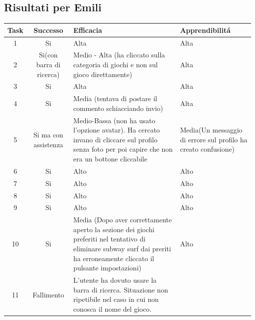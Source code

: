 \documentclass[../Report.tex]{subfiles}
\begin{document}
    \subsection{Risultati per Emili}
    \begin{table}[H]
        \begin{tabular}{|c|c|p{5cm}|p{4cm}|}
            \hline
            Task & Successo & Efficacia & Apprendibilitá \\
            \hline
            1 & Si & Alta & Alta \\
            \hline
            2 & Si(con barra di ricerca) & Medio - Alta (ha cliccato sulla categoria di giochi e non sul gioco direttamente) & Alta \\
            \hline
            3 & Si & Alta & Alta \\
            \hline
            4 & Si & Media (tentava di postare il commento schiacciando invio) & Alta \\
            \hline
            5 & Si ma con assistenza & Medio-Bassa
            (non ha usato l’opzione avatar). Ha cercato invano di cliccare sul profilo senza foto per poi capire che non era un bottone cliccabile & Media(Un messaggio di errore sul profilo ha creato confusione)   \\
            \hline
            6 & Si & Alto & Alto \\
            \hline
            7 & Si & Alto & Alto \\
            \hline
            8 & Si & Alto & Alto \\
            \hline
            9 & Si & Alto & Alto \\
            \hline
            10 & Si & Media (Dopo aver correttamente aperto la sezione dei giochi preferiti nel tentativo di eliminare subway surf dai preriti ha erroneamente cliccato il pulsante impostazioni) & Alto \\
            \hline 
            11 & Fallimento & L’utente ha dovuto usare la barra di ricerca. Situazione non ripetibile nel caso in cui non conosca il nome del gioco. & \\
            \hline
        \end{tabular}
    \end{table}
\end{document}

